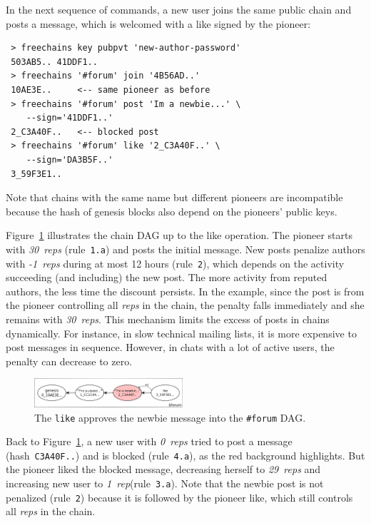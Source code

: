 \documentclass[10pt,journal,compsoc]{IEEEtran}
\newcommand{\reps}     {\emph{reps}\xspace}
\newcommand{\onerep}   {\emph{1~rep}\xspace}
\newcommand{\nreps}[1] {\emph{#1~reps\xspace}}
\begin{document}
In the next sequence of commands, a new user joins the same public chain and
posts a message, which is welcomed with a like signed by the pioneer:

{\footnotesize
\begin{verbatim}
 > freechains key pubpvt 'new-author-password'
 503AB5.. 41DDF1..
 > freechains '#forum' join '4B56AD..'
 10AE3E..     <-- same pioneer as before
 > freechains '#forum' post 'Im a newbie...' \
    --sign='41DDF1..'
 2_C3A40F..   <-- blocked post
 > freechains '#forum' like '2_C3A40F..' \
    --sign='DA3B5F..'
 3_59F3E1..
\end{verbatim}
}

Note that chains with the same name but different pioneers are incompatible
because the hash of genesis blocks also depend on the pioneers' public keys.

Figure~\ref{fig.forum} illustrates the chain DAG up to the like operation.
The pioneer starts with \nreps{30} (rule~\texttt{1.a}) and posts the initial
message.
%
New posts penalize authors with \nreps{-1} during at most 12 hours
(rule~\texttt{2}), which depends on the activity succeeding (and including) the
new post.
The more activity from reputed authors, the less time the discount persists.
In the example, since the post is from the pioneer controlling all \reps in the
chain, the penalty falls immediately and she remains with \nreps{30}.
This mechanism limits the excess of posts in chains dynamically.
For instance, in slow technical mailing lists, it is more expensive to post
messages in sequence.
However, in chats with a lot of active users, the penalty can decrease to zero.

\begin{figure}
\centering
\includegraphics[width=0.49\textwidth]{forum.png}
\caption{
    The \texttt{like} approves the newbie message into the \texttt{\#forum} DAG.
}
\label{fig.forum}
\end{figure}

Back to Figure~\ref{fig.forum}, a new user with \nreps{0} tried to post a
message (hash~\texttt{C3A40F..}) and is blocked (rule~\texttt{4.a}), as the red
background highlights.
But the pioneer liked the blocked message, decreasing herself to \nreps{29}
and increasing new user to \onerep (rule~\texttt{3.a}).
Note that the newbie post is not penalized (rule~\texttt{2}) because it is
followed by the pioneer like, which still controls all \reps in the chain.
\end{document}
